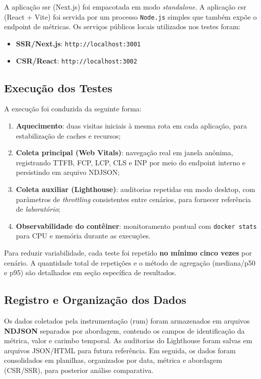 \noindent
A aplicação \acrshort{ssr} (Next.js) foi empacotada em modo \textit{standalone}. A aplicação \acrshort{csr} (React + Vite) foi servida por um processo \texttt{Node.js} simples que também expõe o endpoint de métricas. Os serviços públicos locais utilizados nos testes foram:
\begin{itemize}
    \item \textbf{SSR/Next.js}: \texttt{http://localhost:3001}
    \item \textbf{CSR/React}: \texttt{http://localhost:3002}
\end{itemize}

\subsection{Execução dos Testes}

A execução foi conduzida da seguinte forma:
\begin{enumerate}
    \item \textbf{Aquecimento}: duas visitas iniciais à mesma rota em cada aplicação, para estabilização de caches e recursos;
    \item \textbf{Coleta principal (Web Vitals)}: navegação real em janela anônima, registrando TTFB, FCP, LCP, CLS e INP por meio do endpoint interno e persistindo em arquivo NDJSON;
    \item \textbf{Coleta auxiliar (Lighthouse)}: auditorias repetidas em modo desktop, com parâmetros de \textit{throttling} consistentes entre cenários, para fornecer referência de \textit{laboratório};
    \item \textbf{Observabilidade do contêiner}: monitoramento pontual com \texttt{docker stats} para CPU e memória durante as execuções.
\end{enumerate}

\noindent
Para reduzir variabilidade, cada teste foi repetido \textbf{no mínimo cinco vezes} por cenário. A quantidade total de repetições e o método de agregação (mediana/p50 e p95) são detalhados em seção específica de resultados.

\subsection{Registro e Organização dos Dados}

Os dados coletados pela instrumentação (\acrshort{rum}) foram armazenados em arquivos \textbf{NDJSON} separados por abordagem, contendo os campos de identificação da métrica, valor e carimbo temporal. As auditorias do Lighthouse foram salvas em arquivos JSON/HTML para futura referência. Em seguida, os dados foram consolidados em planilhas, organizados por data, métrica e abordagem (CSR/SSR), para posterior análise comparativa.

